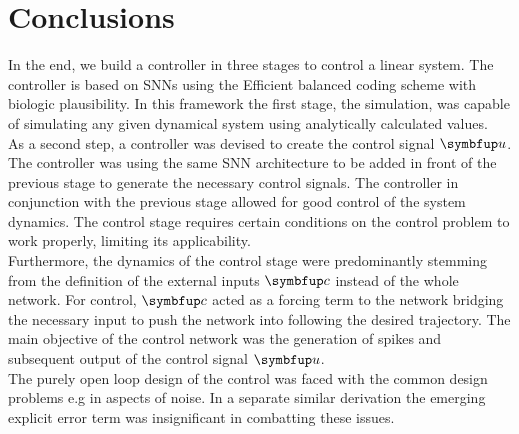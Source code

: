 \chapter{Conclusions}\label{c:conclusions}

In the end, we build a controller in three stages to control a linear system. The controller is based on \acp{SNN} using the Efficient balanced coding scheme with biologic plausibility. In this framework the first stage, the simulation, was capable of simulating any given dynamical system using analytically calculated values.\\
As a second step, a controller was devised to create the control signal $\bmu{u}$. The controller was using the same \ac{SNN} architecture to be added in front of the previous stage to generate the necessary control signals. The controller in conjunction with the previous stage allowed for good control of the system dynamics. The control stage requires certain conditions on the control problem to work properly, limiting its applicability.\\
Furthermore, the dynamics of the control stage were predominantly stemming from the definition of the external inputs $\bmu{c}$ instead of the whole network. For control, $\bmu{c}$ acted as a forcing term to the network bridging the necessary input to push the network into following the desired trajectory. The main objective of the control network was the generation of spikes and subsequent output of the control signal $\bmu{u}$.\\
The purely open loop design of the control was faced with the common design problems e.g in aspects of noise. In a separate similar derivation the emerging explicit error term was insignificant in combatting these issues. \\

